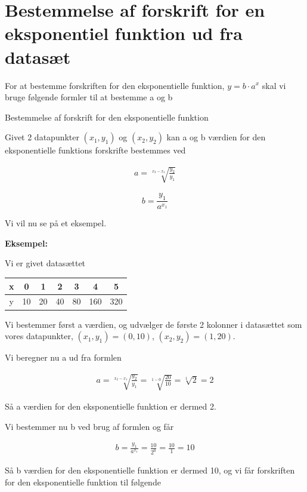 \section*{Bestemmelse af forskrift for en eksponentiel funktion ud fra datasæt}

For at bestemme forskriften for den eksponentielle funktion, $y = b\cdot a^x$ skal vi bruge følgende formler til at bestemme a og b

\begin{frm-thm}{Bestemmelse af forskrift for den eksponentielle funktion}

Givet 2 datapunkter $(x_1, y_1)$ og $(x_2, y_2)$ kan a og b værdien for den eksponentielle funktions forskrifte bestemmes ved

\begin{align*}
a = \sqrt[x_2 - x_1]{\frac{y_2}{y_1}}
\end{align*}

\[b = \frac{y_1}{a^{x_1}}\]

\end{frm-thm}


Vi vil nu se på et eksempel.


\textbf{Eksempel:}

Vi er givet datasættet 

\begin{tabular}{c|c|c|c|c|c|c}
x & 0 & 1 & 2 & 3 & 4 & 5 \\\hline
y & 10 & 20 & 40 & 80 & 160 & 320
\end{tabular}

Vi bestemmer først a værdien, og udvælger de første 2 kolonner i datasættet som vores datapunkter, $(x_1, y_1) = (0, 10)$, $(x_2, y_2) = (1, 20)$.

Vi beregner nu a ud fra formlen 

\begin{align*}
a = \sqrt[x_2 - x_1]{\frac{y_2}{y_1}} = \sqrt[1 - 0]{\frac{20}{10}} = \sqrt[1]{2} = 2
\end{align*}

Så a værdien for den eksponentielle funktion er dermed 2.

Vi bestemmer nu b ved brug af formlen og får

\begin{align*}
b = \frac{y_1}{a^{x_1}} = \frac{10}{2^0} = \frac{10}{1} = 10
\end{align*}

Så b værdien for den eksponentielle funktion er dermed 10, og vi får forskriften for den eksponentielle funktion til følgende

